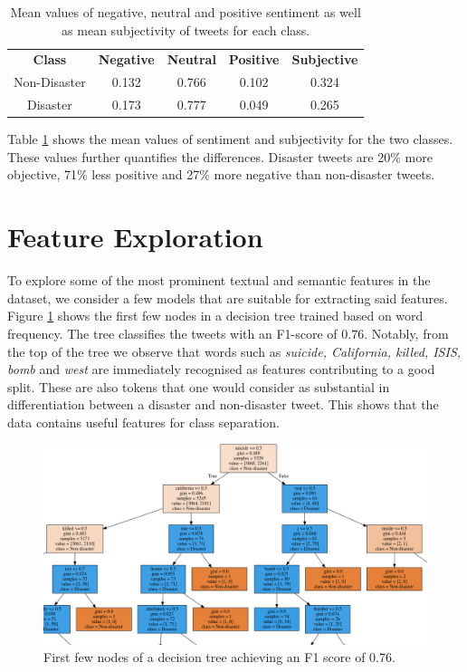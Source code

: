 \documentclass[journal, ]{IEEEtran}
\let\MYoriglatexcaption\caption
\renewcommand{\caption}[2][\relax]{\MYoriglatexcaption[#2]{#2}}
\begin{document}
\begin{table}[hbt!]
  \begin{center}
   \begin{tabular}{c|c|c|c|c} 
   \hline
    \textbf{Class} & \textbf{Negative} & 
      \textbf{Neutral} & \textbf{Positive} & \textbf{Subjective}\\
    Non-Disaster & 0.132 & 0.766 & 0.102 & 0.324\\
    Disaster & 0.173 & 0.777 & 0.049 & 0.265\\
   \hline
  \end{tabular}
  \end{center}
  \caption{Mean values of negative, neutral and positive sentiment as well as
  mean subjectivity of tweets for each class.}
  \label{tab:sentiment}
\end{table}

Table \ref{tab:sentiment} shows the mean values of sentiment and
subjectivity for the two classes. These values further quantifies the
differences. Disaster tweets are 20\% more objective, 71\% less positive
and 27\% more negative than non-disaster tweets. 

\section{Feature Exploration}
To explore some of the most prominent textual and semantic features in the
dataset, we consider a few models that are suitable for extracting said
features. Figure \ref{fig:decision_tree} shows the first few nodes in a
decision tree trained based on word frequency. The tree classifies the tweets
with an F1-score of $0.76$. Notably, from the top of the tree we observe that
words such as \textit{suicide, California, killed, ISIS, bomb} and
\textit{west} are immediately recognised as features contributing to a good
split. These are also tokens that one would consider as substantial in
differentiation between a disaster and non-disaster tweet. This shows that the
data contains useful features for class separation.

\begin{figure}[hbt!]
  \centering
  \includegraphics[width=\linewidth]{../figures/decision_tree.png}
  \caption{First few nodes of a decision tree achieving an F1 score of 0.76.}
  \label{fig:decision_tree}
\end{figure}
\end{document}
